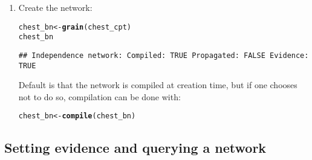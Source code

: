 \documentclass[10pt]{article}\usepackage[]{graphicx}\usepackage[]{xcolor}
\makeatletter
\newcommand{\hlstd}[1]{\textcolor[rgb]{0.345,0.345,0.345}{#1}}%
\newcommand{\hlkwb}[1]{\textcolor[rgb]{0.69,0.353,0.396}{#1}}%
\newcommand{\hlkwd}[1]{\textcolor[rgb]{0.737,0.353,0.396}{\textbf{#1}}}%
\newenvironment{kframe}{%
 \def\at@end@of@kframe{}%
 \ifinner\ifhmode%
  \def\at@end@of@kframe{\end{minipage}}%
  \begin{minipage}{\columnwidth}%
 \fi\fi%
 \def\FrameCommand##1{\hskip\@totalleftmargin \hskip-\fboxsep
 \colorbox{shadecolor}{##1}\hskip-\fboxsep
     \hskip-\linewidth \hskip-\@totalleftmargin \hskip\columnwidth}%
 \MakeFramed {\advance\hsize-\width
   \@totalleftmargin\z@ \linewidth\hsize
   \@setminipage}}%
 {\par\unskip\endMakeFramed%
 \at@end@of@kframe}
\newenvironment{knitrout}{}{} %
\makeatother
\begin{document}
\begin{enumerate}
\item Create the network:
\begin{knitrout}
\color{fgcolor}\begin{kframe}
\begin{alltt}
\hlstd{chest_bn} \hlkwb{<-} \hlkwd{grain}\hlstd{(chest_cpt)}
\hlstd{chest_bn}
\end{alltt}
\begin{verbatim}
## Independence network: Compiled: TRUE Propagated: FALSE Evidence: TRUE
\end{verbatim}
\end{kframe}
\end{knitrout}

Default is that the network is compiled at creation time, but if one
chooses not to do so, compilation can be done with:

\begin{knitrout}
\color{fgcolor}\begin{kframe}
\begin{alltt}
\hlstd{chest_bn} \hlkwb{<-} \hlkwd{compile}\hlstd{(chest_bn)}
\end{alltt}
\end{kframe}
\end{knitrout}

\end{enumerate}

\subsection{Setting evidence and querying a network}
\label{sec:querying-network}
\end{document}
